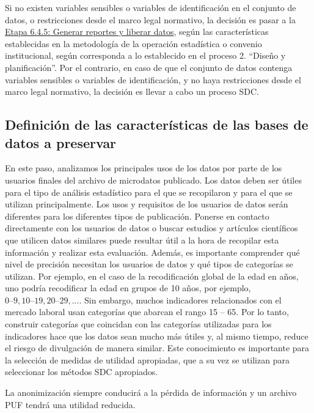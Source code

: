\documentclass[
]{book}
\theoremstyle{definition}
\theoremstyle{definition}
\theoremstyle{definition}
\theoremstyle{definition}
\theoremstyle{remark}
\begin{document}
Si no existen variables sensibles o variables de identificación en el conjunto de datos, o restricciones desde el marco legal normativo, la decisión es pasar a la \protect\hyperlink{etapa-6.4.5-generar-reportes-y-liberar-datos}{Etapa 6.4.5: Generar reportes y liberar datos}, según las características establecidas en la metodología de la operación estadística o convenio institucional, según corresponda a lo establecido en el proceso 2. ``Diseño y planificación''. Por el contrario, en caso de que el conjunto de datos contenga variables sensibles o variables de identificación, y no haya restricciones desde el marco legal normativo, la decisión es llevar a cabo un proceso SDC.

\hypertarget{definiciuxf3n-de-las-caracteruxedsticas-de-las-bases-de-datos-a-preservar}{%
\subsection{Definición de las características de las bases de datos a preservar}\label{definiciuxf3n-de-las-caracteruxedsticas-de-las-bases-de-datos-a-preservar}}

En este paso, analizamos los principales usos de los datos por parte de los usuarios finales del archivo de microdatos publicado. Los datos deben ser útiles para el tipo de análisis estadístico para el que se recopilaron y para el que se utilizan principalmente. Los usos y requisitos de los usuarios de datos serán diferentes para los diferentes tipos de publicación. Ponerse en contacto directamente con los usuarios de datos o buscar estudios y artículos científicos que utilicen datos similares puede resultar útil a la hora de recopilar esta información y realizar esta evaluación. Además, es importante comprender qué nivel de precisión necesitan los usuarios de datos y qué tipos de categorías se utilizan. Por ejemplo, en el caso de la recodificación global de la edad en años, uno podría recodificar la edad en grupos de 10 años, por ejemplo, \(0 – 9, 10 – 19, 20 – 29, ...\). Sin embargo, muchos indicadores relacionados con el mercado laboral usan categorías que abarcan el rango 15 -- 65. Por lo tanto, construir categorías que coincidan con las categorías utilizadas para los indicadores hace que los datos sean mucho más útiles y, al mismo tiempo, reduce el riesgo de divulgación de manera similar. Este conocimiento es importante para la selección de medidas de utilidad apropiadas, que a su vez se utilizan para seleccionar los métodos SDC apropiados.

La anonimización siempre conducirá a la pérdida de información y un archivo PUF tendrá una utilidad reducida.
\end{document}
